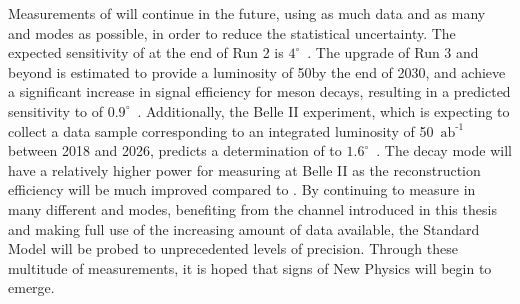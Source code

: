 Measurements of \Pgamma will continue in the future, using as much data and as many \B and \D modes as possible, in order to reduce the statistical uncertainty. The expected sensitivity of \Pgamma at the end of Run 2 is $4^{\circ}$~\cite{LHCb-PAPER-2012-031}. The upgrade of Run 3 and beyond is estimated to provide a luminosity of 50\invfb by the end of 2030, and achieve a significant increase in signal efficiency for \B meson decays, resulting in a predicted sensitivity to \Pgamma of $0.9^{\circ}$~\cite{LHCb-PAPER-2012-031}. Additionally, the Belle II experiment, which is expecting to collect a data sample corresponding to an integrated luminosity of 50~$\text{ab}^{\text{-1}}$ between 2018 and 2026, predicts a determination of \Pgamma to $1.6^{\circ}$~\cite{BelleII}. The \decay{\Bm}{\D\Kstarm(\KS\pim)} decay mode will have a relatively higher power for measuring \Pgamma at Belle II as the \KS reconstruction efficiency will be much improved compared to \lhcb. By continuing to measure \Pgamma in many different \B and \D modes, benefiting from the \btodkst channel introduced in this thesis and making full use of the increasing amount of data available, the Standard Model will be probed to unprecedented levels of precision. Through these multitude of measurements, it is hoped that signs of New Physics will begin to emerge.

\clearpage